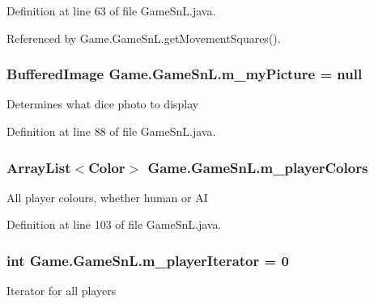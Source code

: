 Definition at line 63 of file Game\+Sn\+L.\+java.



Referenced by Game.\+Game\+Sn\+L.\+get\+Movement\+Squares().

\hypertarget{class_game_1_1_game_sn_l_af12170048b789d0c3303ab35c9b58413}{}
\subsubsection[{m\+\_\+my\+Picture}]{\setlength{\rightskip}{0pt plus 5cm}Buffered\+Image Game.\+Game\+Sn\+L.\+m\+\_\+my\+Picture = null\hspace{0.3cm}{\ttfamily [private]}}\label{class_game_1_1_game_sn_l_af12170048b789d0c3303ab35c9b58413}
Determines what dice photo to display 

Definition at line 88 of file Game\+Sn\+L.\+java.

\hypertarget{class_game_1_1_game_sn_l_aab5fbfe1044b0a403fdfa7634c0c344b}{}
\subsubsection[{m\+\_\+player\+Colors}]{\setlength{\rightskip}{0pt plus 5cm}Array\+List$<$Color$>$ Game.\+Game\+Sn\+L.\+m\+\_\+player\+Colors\hspace{0.3cm}{\ttfamily [private]}}\label{class_game_1_1_game_sn_l_aab5fbfe1044b0a403fdfa7634c0c344b}
All player colours, whether human or A\+I 

Definition at line 103 of file Game\+Sn\+L.\+java.

\hypertarget{class_game_1_1_game_sn_l_a4cff3283ef1f344a871b2019ae92dd57}{}
\subsubsection[{m\+\_\+player\+Iterator}]{\setlength{\rightskip}{0pt plus 5cm}int Game.\+Game\+Sn\+L.\+m\+\_\+player\+Iterator = 0\hspace{0.3cm}{\ttfamily [private]}}\label{class_game_1_1_game_sn_l_a4cff3283ef1f344a871b2019ae92dd57}
Iterator for all players 

